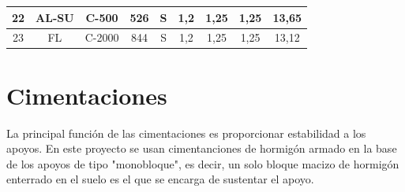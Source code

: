\begin{table}[htbp]
\begin{tabular}{|c|c|c|c|c|cccc|}
22                                                    & AL-SU                                                      & C-500                                                           & 526                                                                                                              & S                                                         & \multicolumn{1}{c|}{1,2}                                & \multicolumn{1}{c|}{1,25}                               & \multicolumn{1}{c|}{1,25}                               & 13,65                                                           \\ \hline
23                                                    & FL                                                         & C-2000                                                          & 844                                                                                                              & S                                                         & \multicolumn{1}{c|}{1,2}                                & \multicolumn{1}{c|}{1,25}                               & \multicolumn{1}{c|}{1,25}                               & 13,12                                                           \\ \hline
\end{tabular}
\end{table}

\section{Cimentaciones}
\label{sec:md-cimentaciones}
La principal función de las cimentaciones es proporcionar estabilidad a los apoyos. En este proyecto se usan cimentanciones de hormigón armado en la base de los apoyos de tipo "monobloque", es decir, un solo bloque macizo de hormigón enterrado en el suelo es el que se encarga de sustentar el apoyo.

